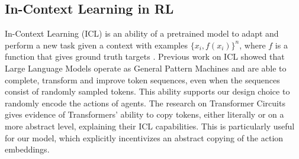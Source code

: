 \documentclass{article}
\theoremstyle{plain}
\theoremstyle{definition}
\theoremstyle{remark}
\begin{document}
\subsection{In-Context Learning in RL}
In-Context Learning (ICL) is an ability of a pretrained model to adapt and perform a new task given a context with examples $\{x_i, f(x_i)\}^n$, where $f$ is a function that gives ground truth targets \cite{brown2020language, wang2023images}. Previous work on ICL \cite{mirchandani2023large} showed that Large Language Models operate as General Pattern Machines and are able to complete, transform and improve token sequences, even when the sequences consist of randomly sampled tokens. This ability supports our design choice to randomly encode the actions of agents. The research on Transformer Circuits \cite{elhage2021mathematical} gives evidence of Transformers' ability to copy tokens, either literally or on a more abstract level, explaining their ICL capabilities. This is particularly useful for our model, which explicitly incentivizes an abstract copying of the action embeddings.
\end{document}
